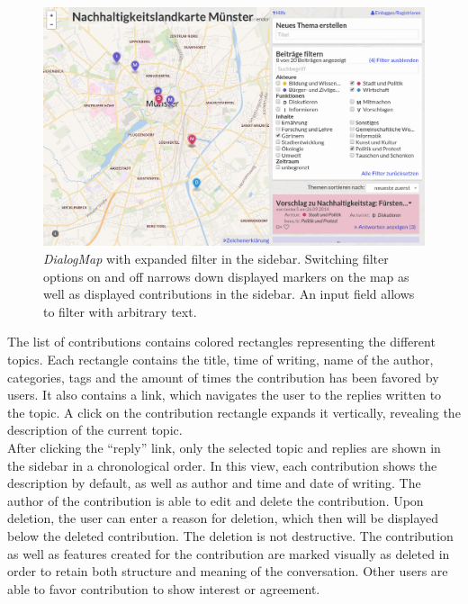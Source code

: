 \begin{figure}[!h]
    \centering
    \includegraphics[width=1\columnwidth]{images/screenshot_filters}
    \caption{\textit{DialogMap} with expanded filter in the sidebar. Switching filter options on and off narrows down displayed markers on the map as well as displayed contributions in the sidebar. An input field allows to filter with arbitrary text.}
    \label{fig:screenshot_filter}
\end{figure}

The list of contributions contains colored rectangles representing the different topics. Each rectangle contains the title, time of writing, name of the author, categories, tags and the amount of times the contribution has been favored by users. It also contains a link, which navigates the user to the replies written to the topic. A click on the contribution rectangle expands it vertically, revealing the description of the current topic.\\
After clicking the ``reply'' link, only the selected topic and replies are shown in the sidebar in a chronological order. In this view, each contribution shows the description by default, as well as author and time and date of writing. The author of the contribution is able to edit and delete the contribution. Upon deletion, the user can enter a reason for deletion, which then will be displayed below the deleted contribution. The deletion is not destructive. The contribution as well as features created for the contribution are marked visually as deleted in order to retain both structure and meaning of the conversation. Other users are able to favor contribution to show interest or agreement.

